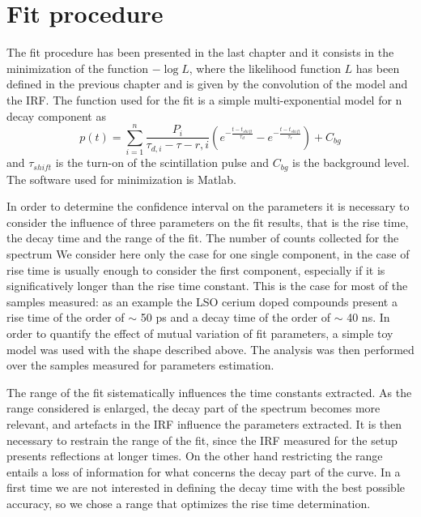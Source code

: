 \section{Fit procedure}
The fit procedure has been presented in the last chapter and it consists in the minimization of the function $-\log{L}$, where the likelihood function $L$ has been defined in the previous chapter and is given by the convolution of the model and the IRF.
The function used for the fit is a simple multi-exponential model for n decay component as
\begin{equation}
p(t) = \sum _{i = 1}^{n} \frac{P_{i}}{\tau _{d, i} - \tau -{r, i}}\left( e^{-\frac{t-t_{shift}}{\tau _{d}}} - e^{-\frac{t-t_{shift}}{\tau _{r}}} \right) + C_{bg}
\end{equation}
and $\tau _{shift}$ is the turn-on of the scintillation pulse and $C_{bg}$ is the background level.
The software used for minimization is Matlab.

In order to determine the confidence interval on the parameters it is necessary to consider the influence of three parameters on the fit results, that is the rise time, the decay time and the range of the fit. 
The number of counts collected for the spectrum 
We consider here only the case for one single component, in the case of rise time is usually enough to consider the first component, especially if it is significatively longer than the rise time constant. This is the case for most of the samples measured: as an example the LSO cerium doped compounds present a rise time of the order of $\sim$ 50 ps and a decay time of the order of $\sim$ 40 ns.
In order to quantify the effect of mutual variation of fit parameters, a simple toy model was used with the shape described above. The analysis was then performed over the samples measured for parameters estimation.

The range of the fit sistematically influences the time constants extracted. As the range considered is enlarged, the  decay part of the spectrum becomes more relevant, and artefacts in the IRF influence the parameters extracted. 
It is then necessary to restrain the range of the fit, since the IRF measured for the setup presents reflections at longer times. On the other hand restricting the range  entails a loss of information for what concerns the decay part of the curve. In a first time we are not interested in defining the decay time with the best possible accuracy, so we chose a range that optimizes the rise time determination.

